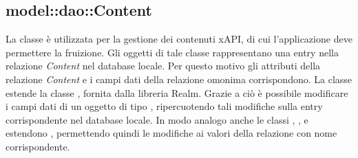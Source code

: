 \documentclass[../Tesi.tex]{subfiles}
\begin{document}
		\subsection{model::dao::Content}
		La classe  è utilizzata per la gestione dei contenuti xAPI, di cui l'applicazione deve permettere la fruizione. Gli oggetti di tale classe rappresentano una entry nella relazione \textit{Content} nel database locale. Per questo motivo gli attributi della relazione \textit{Content} e i campi dati della relazione omonima corrispondono. La classe  estende la classe , fornita dalla libreria Realm. Grazie a ciò è possibile modificare i campi dati di un oggetto di tipo , ripercuotendo tali modifiche sulla entry corrispondente nel database locale. In modo analogo anche le classi , ,  e  estendono , permettendo quindi le modifiche ai valori della relazione con nome corrispondente.
\end{document}
